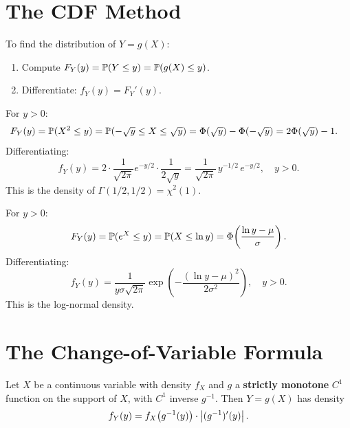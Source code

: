 \section{The CDF Method}

\begin{theorem}
\label{thm:cdf_method}
To find the distribution of $Y = g(X)$:
\begin{enumerate}
    \item Compute $F_Y(y) = \mathbb{P}(Y \leq y) = \mathbb{P}(g(X) \leq y)$.
    \item Differentiate: $f_Y(y) = F_Y'(y)$.
\end{enumerate}
\end{theorem}

\begin{example}[$Y = X^2$ with $X \sim \mathcal{N}(0,1)$]
For $y > 0$:
\begin{align*}
    F_Y(y) &= \mathbb{P}(X^2 \leq y) = \mathbb{P}(-\sqrt{y} \leq X \leq \sqrt{y})
    = \Phi(\sqrt{y}) - \Phi(-\sqrt{y}) = 2\Phi(\sqrt{y}) - 1.
\end{align*}
Differentiating:
\[
    f_Y(y) = 2 \cdot \frac{1}{\sqrt{2\pi}}e^{-y/2}\cdot\frac{1}{2\sqrt{y}}
    = \frac{1}{\sqrt{2\pi}}\,y^{-1/2}\,e^{-y/2}, \quad y > 0.
\]
This is the density of $\Gamma(1/2, 1/2) = \chi^2(1)$.
\end{example}

\begin{example}[$Y = e^X$ with $X \sim \mathcal{N}(\mu, \sigma^2)$]
For $y > 0$:
\[
    F_Y(y) = \mathbb{P}(e^X \leq y) = \mathbb{P}(X \leq \ln y)
    = \Phi\!\left(\frac{\ln y - \mu}{\sigma}\right).
\]
Differentiating:
\[
    f_Y(y) = \frac{1}{y\sigma\sqrt{2\pi}}
    \exp\!\left(-\frac{(\ln y - \mu)^2}{2\sigma^2}\right), \quad y > 0.
\]
This is the log-normal density.
\end{example}

\section{The Change-of-Variable Formula}

\begin{theorem}
\label{thm:change_var}
Let $X$ be a continuous variable with density $f_X$ and $g$ a
\textbf{strictly monotone} $C^1$ function on the support of $X$, with $C^1$
inverse $g^{-1}$. Then $Y = g(X)$ has density
\[
    f_Y(y) = f_X\bigl(g^{-1}(y)\bigr)\cdot\left| (g^{-1})'(y) \right|.
\]
\end{theorem}


